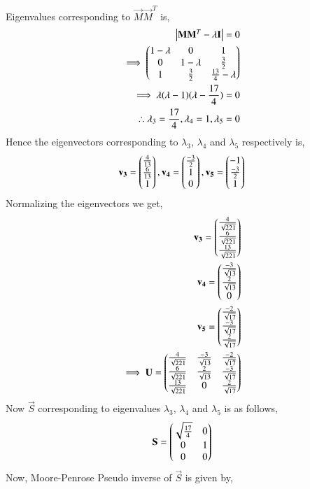 \documentclass[journal,12pt,twocolumn]{IEEEtran}
\begin{document}
Eigenvalues corresponding to $\vec{M}\vec{M}^T$  is,
\begin{align}
\begin{vmatrix}\mathbf{M}\mathbf{M}^T-\lambda\mathbf{I}\end{vmatrix} = 0\\
\implies \begin{pmatrix}1-\lambda&0&1\\0&1-\lambda&\frac{3}{2}\\1&\frac{3}{2}&\frac{13}{4}-\lambda\end{pmatrix}\\
\implies \lambda(\lambda-1)(\lambda-\frac{17}{4}) = 0\\
\therefore \lambda_3 = \frac{17}{4}, \lambda_4 = 1, \lambda_5 = 0\label{eq:lambda5}
\end{align} 
Hence the eigenvectors corresponding to $\lambda_3$, $\lambda_4$ and  $\lambda_5$ respectively is,
\begin{align}
\mathbf{v_3} =\begin{pmatrix}\frac{4}{13}\\\frac{6}{13}\\1\end{pmatrix},
\mathbf{v_4} =\begin{pmatrix}\frac{-3}{2}\\1\\0\end{pmatrix},
\mathbf{v_5} = \begin{pmatrix}-1\\\frac{-3}{2}\\1\end{pmatrix}
\end{align}
Normalizing the eigenvectors we get,
\begin{align}
\mathbf{v_3} = \begin{pmatrix}\frac{4}{\sqrt{221}}\\\frac{6}{\sqrt{221}}\\\frac{13}{\sqrt{221}}\end{pmatrix}\\
\mathbf{v_4} = \begin{pmatrix}\frac{-3}{\sqrt{13}}\\\frac{2}{\sqrt{13}}\\0\end{pmatrix}\\
\mathbf{v_5} = \begin{pmatrix}\frac{-2}{\sqrt{17}}\\\frac{-3}{\sqrt{17}}\\\frac{2}{\sqrt{17}}\end{pmatrix}\\
\implies \mathbf{U} = \begin{pmatrix}\frac{4}{\sqrt{221}} &\frac{-3}{\sqrt{13}} & \frac{-2}{\sqrt{17}}\\\frac{6}{\sqrt{221}} &\frac{2}{\sqrt{13}} &\frac{-3}{\sqrt{17}} \\\frac{13}{\sqrt{221}}&0& \frac{2}{\sqrt{17}}\end{pmatrix} \label{eq:U}
\end{align} 
Now $\vec{S}$ corresponding to eigenvalues $\lambda_3$, $\lambda_4$ and  $\lambda_5$ is as follows,
\begin{align}
\mathbf{S} = \begin{pmatrix}\sqrt{\frac{17}{4}}&0\\0&1\\0&0\end{pmatrix}
\end{align}
Now, Moore-Penrose Pseudo inverse of $\vec{S}$ is given by,
\end{document}
